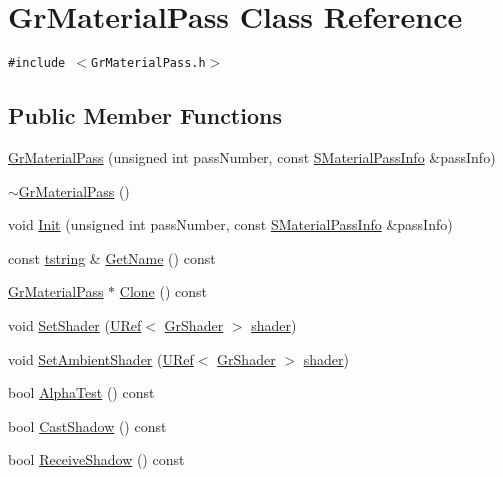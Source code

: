 \hypertarget{class_gr_material_pass}{
\section{GrMaterialPass Class Reference}
\label{class_gr_material_pass}
}
{\tt \#include $<$GrMaterialPass.h$>$}

\subsection*{Public Member Functions}
\begin{CompactItemize}
\item 
\hyperlink{class_gr_material_pass_d51b379c745b2f20189f9d2f141ccc2b}{GrMaterialPass} (unsigned int passNumber, const \hyperlink{struct_s_material_pass_info}{SMaterialPassInfo} \&passInfo)
\item 
\hyperlink{class_gr_material_pass_892c0b01e532282399b758197ae866f7}{$\sim$GrMaterialPass} ()
\item 
void \hyperlink{class_gr_material_pass_9ca0165a2f76e561040f97a821652a98}{Init} (unsigned int passNumber, const \hyperlink{struct_s_material_pass_info}{SMaterialPassInfo} \&passInfo)
\item 
const \hyperlink{common__afx_8h_816fa58fd77499b0edb2c69ebe803d5c}{tstring} \& \hyperlink{class_gr_material_pass_dc8d850ec17437ac3000c63a00205476}{GetName} () const 
\item 
\hyperlink{class_gr_material_pass}{GrMaterialPass} $\ast$ \hyperlink{class_gr_material_pass_98a5f91d9690f1e6cba0fc5355f96529}{Clone} () const 
\item 
void \hyperlink{class_gr_material_pass_5931c31c1ffda6b191f09f49000f2d11}{SetShader} (\hyperlink{class_u_ref}{URef}$<$ \hyperlink{class_gr_shader}{GrShader} $>$ \hyperlink{glext_8h_57b2a96adb1d51204909a82d861e395e}{shader})
\item 
void \hyperlink{class_gr_material_pass_5b1a5c20c0299b3e7eda73d377021509}{SetAmbientShader} (\hyperlink{class_u_ref}{URef}$<$ \hyperlink{class_gr_shader}{GrShader} $>$ \hyperlink{glext_8h_57b2a96adb1d51204909a82d861e395e}{shader})
\item 
bool \hyperlink{class_gr_material_pass_854289ca69d0efcfe29047c80c25fd3d}{AlphaTest} () const 
\item 
bool \hyperlink{class_gr_material_pass_c968cf3eafd243fa2de5ffaf3e3d2981}{CastShadow} () const 
\item 
bool \hyperlink{class_gr_material_pass_ca6fb93ef3404e9aad9396cd7aecb083}{ReceiveShadow} () const 

\end{CompactItemize}
